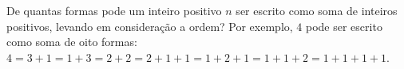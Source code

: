 De quantas formas pode um inteiro positivo $n$ ser escrito como soma de inteiros positivos, levando em consideração a ordem?
Por exemplo, $4$ pode ser escrito como soma de oito formas: $4 = 3 + 1 = 1 + 3 = 2 + 2 = 2 + 1 + 1 = 1 + 2 + 1 = 1 + 1 + 2 = 1 + 1 + 1 + 1$.
